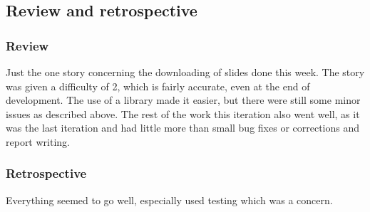 \subsection{Review and retrospective}
\subsubsection{Review}
Just the one story concerning the downloading of slides done this week. The story was given a difficulty of 2, which is fairly accurate, even at the end of development. The use of a library made it easier, but there were still some minor issues as described above. The rest of the work this iteration also went well, as it was the last iteration and had little more than small bug fixes or corrections and report writing.
\subsubsection{Retrospective}
Everything seemed to go well, especially used testing which was a concern.
\newpage
